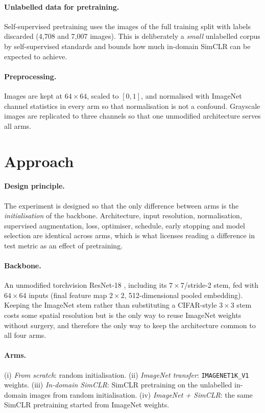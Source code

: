 \documentclass{article}
\begin{document}
\paragraph{Unlabelled data for pretraining.} Self-supervised pretraining uses the images
of the full training split with labels discarded (4{,}708 and 7{,}007 images). This is
deliberately a \emph{small} unlabelled corpus by self-supervised standards and bounds how
much in-domain SimCLR can be expected to achieve.

\paragraph{Preprocessing.} Images are kept at $64\times64$, scaled to $[0,1]$, and
normalised with ImageNet channel statistics in every arm so that normalisation is not a
confound. Grayscale images are replicated to three channels so that one unmodified
architecture serves all arms.

\section{Approach}

\paragraph{Design principle.} The experiment is designed so that the only difference
between arms is the \emph{initialisation} of the backbone. Architecture, input
resolution, normalisation, supervised augmentation, loss, optimiser, schedule, early
stopping and model selection are identical across arms, which is what licenses reading a
difference in test metric as an effect of pretraining.

\paragraph{Backbone.} An unmodified torchvision ResNet-18 \citep{he2016resnet}, including
its $7\times7$/stride-2 stem, fed with $64\times64$ inputs (final feature map
$2\times2$, 512-dimensional pooled embedding). Keeping the ImageNet stem rather than
substituting a CIFAR-style $3\times3$ stem costs some spatial resolution but is the only
way to reuse ImageNet weights without surgery, and therefore the only way to keep the
architecture common to all four arms.

\paragraph{Arms.} (i) \emph{From scratch}: random initialisation. (ii) \emph{ImageNet
transfer}: \texttt{IMAGENET1K\_V1} weights. (iii) \emph{In-domain SimCLR}: SimCLR
pretraining on the unlabelled in-domain images from random initialisation.
(iv) \emph{ImageNet + SimCLR}: the same SimCLR pretraining started from ImageNet weights.
\end{document}
